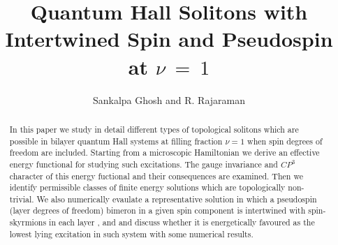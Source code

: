 

\draft
\def\beq{\begin{equation}}
\def\eeq{\end{equation}}
\def\beqarr{\begin{eqnarray}}
\def\eeqarr{\end{eqnarray}}
\def\bc{\begin{center}}
\def\ec{\end{center}}
\def\ca{\cos \alpha }
\def\ct{\cos \theta_{u}}
\def\st{\sin \theta_{u}}
\begin{center}
\title{Quantum Hall Solitons with Intertwined Spin and Pseudospin   at $\nu \ = \ 1$}
\author{Sankalpa Ghosh and R. Rajaraman\cite{byline1}}

\address{School of Physical Sciences \\ Jawaharlal Nehru University\\ New Delhi 110067, \ INDIA\\ }

\maketitle

\end{center}
\begin{abstract}
In this paper we study in detail different types of topological
solitons which are possible in bilayer quantum Hall systems at filling
fraction $\nu =1$ when spin degrees of freedom are included. Starting from a
microscopic Hamiltonian we derive an effective energy functional
for studying such excitations. The gauge invariance and $CP^{3}$ character
of this energy fuctional and their consequences are examined. 
Then we identify permissible classes of
finite energy solutions which are topologically non-trivial. 
We also numerically evaulate
a representative solution in which a pseudospin (layer degrees of freedom)
bimeron in a given spin component is intertwined with spin-skyrmions
in each layer ,
and and discuss whether it is energetically favoured as
the lowest lying excitation in such system with some numerical results.
\end{abstract}
\vskip16pt

